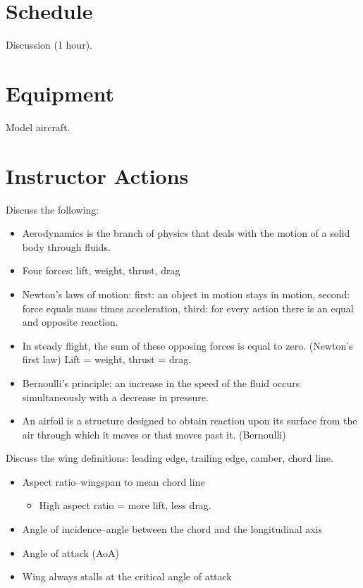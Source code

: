 \documentclass[twoside,openright]{report}
\begin{document}
\section{Schedule}

Discussion (1 hour).

\section{Equipment}

Model aircraft.

\section{Instructor Actions}

Discuss the following:

\begin{itemize}
  \item Aerodynamics is the branch of physics that deals with the motion of a
    solid body through fluids.

  \item Four forces: lift, weight, thrust, drag

  \item Newton's laws of motion: first: an object in motion stays in motion,
    second: force equals mass times acceleration, third: for every action there
    is an equal and opposite reaction.

  \item In steady flight, the sum of these opposing forces is equal to zero.
    (Newton's first law) Lift = weight, thrust = drag.

  \item Bernoulli's principle: an increase in the speed of the fluid occurs
    simultaneously with a decrease in pressure.

  \item An airfoil is a structure designed to obtain reaction upon its surface
    from the air through which it moves or that moves past it. (Bernoulli)
\end{itemize}

Discuss the wing definitions: leading edge, trailing edge, camber, chord line.

\begin{itemize}
  \item Aspect ratio--wingspan to mean chord line
    \begin{itemize}
      \item High aspect ratio = more lift, less drag.
    \end{itemize}

  \item Angle of incidence--angle between the chord and the longitudinal axis

  \item Angle of attack (AoA)

  \item Wing always stalls at the critical angle of attack
\end{itemize}
\end{document}
